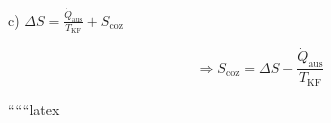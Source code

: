 c) $\Delta S = \frac{\dot{Q}_{\text{aus}}}{T_{\text{KF}}} + S_{\text{coz}}$

\[
\Rightarrow S_{\text{coz}} = \Delta S - \frac{\dot{Q}_{\text{aus}}}{T_{\text{KF}}}
\]

``````latex
